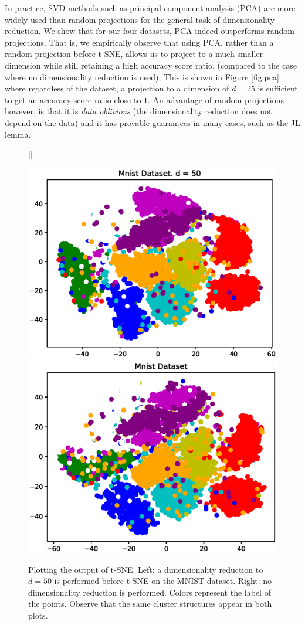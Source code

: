 \documentclass[12pt]{opt2019} %
\begin{document}
In practice, SVD methods such as principal component analysis (PCA) are more widely used than random projections for the general task of dimensionality reduction. We show that for our four datasets, PCA indeed outperforms random projections. That is, we empirically observe that using PCA, rather than a random projection before t-SNE, allows us to project to a much smaller dimension while still retaining a high accuracy score ratio, (compared to the case where no dimensionality reduction is used). This is shown in Figure \ref{fig:pca} where regardless of the dataset, a projection to a dimension of $d = 25$ is sufficient to get an accuracy score ratio close to $1$. An advantage of random projections however, is that it is \emph{data oblivious} (the dimensionality reduction does not depend on the data) and it has provable guarantees in many cases, such as the JL lemma. 


\begin{figure}[!htbp]
[\FBwidth]
{\caption{Plotting the output of t-SNE.  Left: a dimensionality reduction to $d=50$ is performed before t-SNE on the MNIST dataset. Right: no dimensionality reduction is performed. Colors represent the label of the points. Observe that the same cluster structures appear in both plots.}\label{fig:clusterviz}}
{\includegraphics[width=.4\textwidth]{mnistviz_d50.eps}
\includegraphics[width=.4\textwidth]{mnistviz_dfull.eps}}
\end{figure}





%
\end{document}
